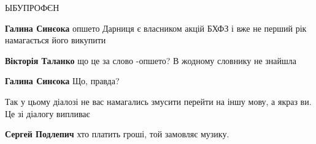 \begin{itemize}
\begin{itemize}
ЫБУПРОФЄН

 
\textbf{Галина Синєока} опшето Дарниця є власником акцій БХФЗ і вже не перший рік намагається його викупити

 
\textbf{Вікторія Таланко} що це за слово -опшето? В жодному словнику не знайшла

 
\textbf{Галина Синєока}
Що, правда?

\end{itemize}

 
Так у цьому діалозі не вас намагались змусити перейти на іншу мову, а якраз ви.
Це зі діалогу випливає

\begin{itemize}
 
\textbf{Сергей Подлепич} хто платить гроші, той замовляє музику.

 

\end{itemize}
\end{itemize}
